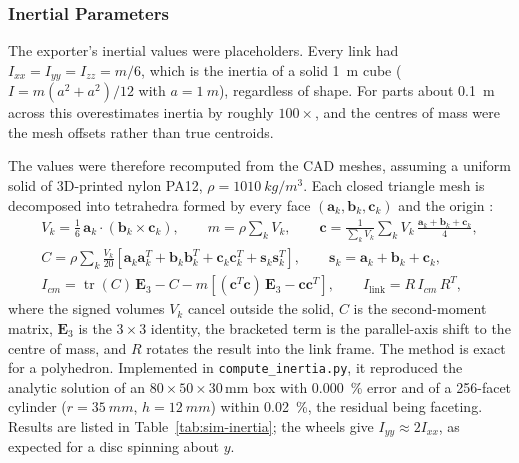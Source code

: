 \documentclass[12pt,a4paper]{article}
\begin{document}
\subsubsection{Inertial Parameters}

The exporter's inertial values were placeholders. Every link had $I_{xx} = I_{yy} = I_{zz} = m/6$, which is the inertia of a solid \SI{1}{m} cube ($I = m(a^2 + a^2)/12$ with $a = \SI{1}{m}$), regardless of shape. For parts about \SI{0.1}{m} across this overestimates inertia by roughly $100\times$, and the centres of mass were the mesh offsets rather than true centroids.

The values were therefore recomputed from the CAD meshes, assuming a uniform solid of 3D-printed nylon PA12, $\rho = \SI{1010}{kg/m^3}$. Each closed triangle mesh is decomposed into tetrahedra formed by every face $(\mathbf{a}_k, \mathbf{b}_k, \mathbf{c}_k)$ and the origin \cite{mirtich1996}:
\begin{gather}
	V_k = \tfrac{1}{6}\,\mathbf{a}_k \cdot (\mathbf{b}_k \times \mathbf{c}_k), \qquad
	m = \rho \sum_k V_k, \qquad
	\mathbf{c} = \frac{1}{\sum_k V_k} \sum_k V_k\,\frac{\mathbf{a}_k + \mathbf{b}_k + \mathbf{c}_k}{4}, \\
	C = \rho \sum_k \frac{V_k}{20} \left[ \mathbf{a}_k\mathbf{a}_k^{T} + \mathbf{b}_k\mathbf{b}_k^{T} + \mathbf{c}_k\mathbf{c}_k^{T} + \mathbf{s}_k\mathbf{s}_k^{T} \right],
	\qquad \mathbf{s}_k = \mathbf{a}_k + \mathbf{b}_k + \mathbf{c}_k, \\
	I_{cm} = \operatorname{tr}(C)\,\mathbf{E}_3 - C - m\left[ (\mathbf{c}^{T}\mathbf{c})\,\mathbf{E}_3 - \mathbf{c}\mathbf{c}^{T} \right], \qquad
	I_{\text{link}} = R\,I_{cm}\,R^{T},
\end{gather}
where the signed volumes $V_k$ cancel outside the solid, $C$ is the second-moment matrix, $\mathbf{E}_3$ is the $3 \times 3$ identity, the bracketed term is the parallel-axis shift to the centre of mass, and $R$ rotates the result into the link frame. The method is exact for a polyhedron. Implemented in \texttt{compute\_inertia.py}, it reproduced the analytic solution of an $80 \times 50 \times 30$\,mm box with \SI{0.000}{\percent} error and of a 256-facet cylinder ($r = \SI{35}{mm}$, $h = \SI{12}{mm}$) within \SI{0.02}{\percent}, the residual being faceting. Results are listed in Table~\ref{tab:sim-inertia}; the wheels give $I_{yy} \approx 2 I_{xx}$, as expected for a disc spinning about $y$.
\end{document}
